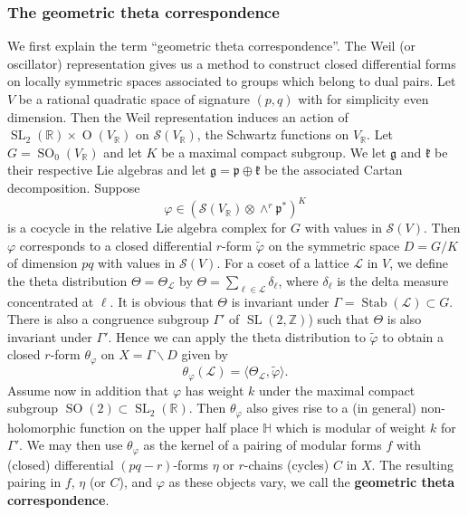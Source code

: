 \documentclass[12pt,leqno]{amsart}
\numberwithin{equation}{section}
\theoremstyle{plain}
\theoremstyle{definition}
\theoremstyle{remark}
\newcommand{\R}{\mathbb{R}}
\newcommand{\Z}{\mathbb{Z}}
\newcommand{\h}{\mathbb{H}}
\newcommand{\G}{\Gamma}
\newcommand{\Stab}{\operatorname{Stab}}
\newcommand{\SL}{\operatorname{SL}}
\newcommand{\Orth}{\operatorname{O}}
\newcommand{\SO}{\operatorname{SO}}
\begin{document}
%

\subsubsection*{The geometric theta correspondence}

We first explain the term ``geometric theta correspondence''. The Weil (or oscillator) representation gives us a method to construct closed differential forms on locally
symmetric spaces associated to groups which belong to dual pairs. Let $V$ be a rational quadratic space of signature $(p,q)$ with for simplicity even dimension. Then the Weil representation induces an action of $\SL_2(\R) \times \Orth(V_\R)$ on $\mathcal{S}(V_\R)$, the Schwartz functions on $V_\R$. Let $G = \SO_0(V_\R)$ and let $K$ be a maximal compact subgroup. We let $\mathfrak{g}$ and $\mathfrak{k}$ be their respective Lie algebras and let $\mathfrak{g} = \mathfrak{p} \oplus \mathfrak{k}$ be the associated Cartan decomposition. Suppose 
\[
\varphi\in (\mathcal{S}(V_\R) \otimes \wedge^r \mathfrak{p}^{\ast})^{K}
\]
is a cocycle in the relative
Lie algebra complex for $G$ with values in $\mathcal{S}(V)$. Then $\varphi$ corresponds to a closed differential $r$-form $\tilde{\varphi}$ on the symmetric space $D= G/K$ of dimension $pq$ with values in $\mathcal{S}(V)$.
For a coset of a lattice $\mathcal{L}$ in $V$, we define the theta distribution $\Theta=\Theta_{\mathcal{L}}$ by $\Theta = \sum_{\ell \in \mathcal{L}} \delta_{\ell}$, where $ \delta_{\ell}$ is the delta measure concentrated at $\ell$. It is obvious that $\Theta$ is invariant under $\G = \Stab(\mathcal{L}) \subset G$. There is also a congruence subgroup $\Gamma'$ of $\SL(2,\Z)$) such that $\Theta$ is also invariant under $\Gamma'$. Hence we can apply the theta distribution to $\tilde{\varphi}$ to obtain a closed $r$-form $\theta_{\varphi}$ on $X = \Gamma \backslash D$ given by 
\[
\theta_{\varphi}(\mathcal{L})= \langle \Theta_{\mathcal{L}}, \tilde{\varphi} \rangle.
\]
Assume now in addition that $\varphi$ has weight $k$ under the maximal compact subgroup $\SO(2) \subset \SL_2(\R)$. Then $\theta_{\varphi}$ also gives rise to a (in general) non-holomorphic function on the upper half place $\h$ which is modular of weight $k$ for $\G'$. We may then use $\theta_{\varphi}$ as the kernel of a pairing of modular forms $f$ with (closed) differential $(pq-r)$-forms $\eta$ or $r$-chains (cycles) $C$ in $X$. The resulting pairing in $f$, $\eta$ (or $C$), and $\varphi$ as these objects vary, we call the {\bf geometric theta correspondence}. 
\end{document}
